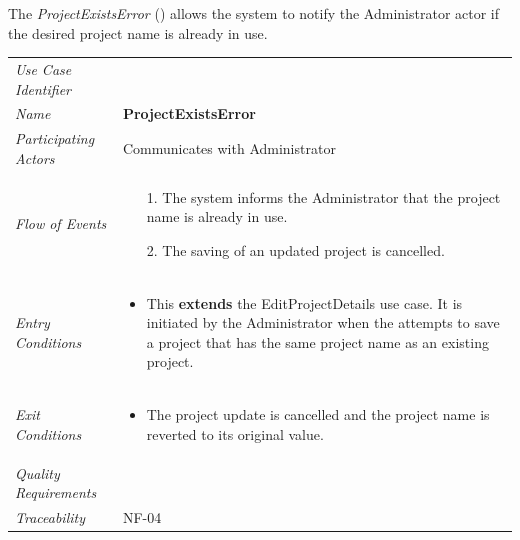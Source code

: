\documentclass[12pt,letterpaper]{article}
\begin{document}
\newpage{}

The {\it ProjectExistsError} ({\bf \projectexistserror{}}) allows the system to notify the Administrator actor if the desired project name is already in use.

\begin{center}
	\begin{tabu} to 
		\toprule
		Use Case Identifier & \projectexistserror{} \\
		Name & {\bf ProjectExistsError} \\
		Participating Actors & Communicates with Administrator \\
		Flow of Events & 
		\begin{minipage}[t]{\linewidth}
		    \begin{enumerate}
			    \item[1.] The system informs the Administrator that the project name is already in use.
			    \item[2.] The saving of an updated project is cancelled.
			\end{enumerate}
		\end{minipage} \\

		Entry Conditions &
		\begin{minipage}[t]{\linewidth}
			\begin{itemize}
			    \item This \textbf{extends} the EditProjectDetails use case. It is initiated by the Administrator when the attempts to save a project that has the same project name as an existing project.
	        \end{itemize}
		\end{minipage} \\

		Exit Conditions &
		\begin{minipage}[t]{\linewidth}
			\begin{itemize}
			    \item The project update is cancelled and the project name is reverted to its original value.
	        \end{itemize}
		\end{minipage} \\

		Quality Requirements & \\

		Traceability & NF-04 \\
		\toprule
	\end{tabu}
\end{center}
\end{document}
